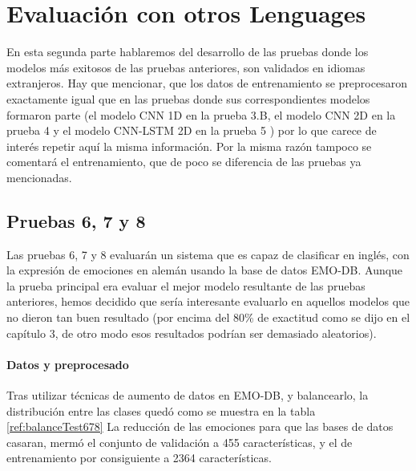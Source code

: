 \documentclass[11pt,a4paper,spanish]{book}
\begin{document}
	\section{Evaluación con otros Lenguages}
	En esta segunda parte hablaremos del desarrollo de las pruebas donde los modelos más exitosos de las pruebas anteriores, son validados en idiomas extranjeros.
	Hay que mencionar, que los datos de entrenamiento se preprocesaron exactamente igual que en las pruebas donde sus correspondientes modelos formaron parte (el modelo CNN 1D en la prueba 3.B, el modelo CNN 2D en la prueba 4 y el modelo CNN-LSTM 2D en la prueba 5 ) por lo que carece de interés repetir aquí la misma información. 
	Por la misma razón tampoco se comentará el entrenamiento, que de poco se diferencia de las pruebas ya mencionadas.
	
	\subsection{Pruebas 6, 7 y 8}
	Las pruebas 6, 7 y 8 evaluarán un sistema que es capaz de clasificar en inglés, con la expresión de emociones en alemán usando la base de datos EMO-DB. Aunque la prueba principal era evaluar el mejor modelo resultante de las pruebas anteriores, hemos decidido que sería interesante evaluarlo en aquellos modelos que no dieron tan buen resultado (por encima del 80\% de exactitud como se dijo en el capítulo 3, de otro modo esos resultados podrían ser demasiado aleatorios).
	 
	\paragraph{Datos y preprocesado}

	Tras utilizar técnicas de aumento de datos en EMO-DB, y balancearlo, la distribución entre las clases quedó como se muestra en la tabla \ref{ref:balanceTest678}
	La reducción de las emociones para que las bases de datos casaran, mermó el conjunto de validación a 455 características, y el de entrenamiento por consiguiente a 2364 características.
	
\end{document}
